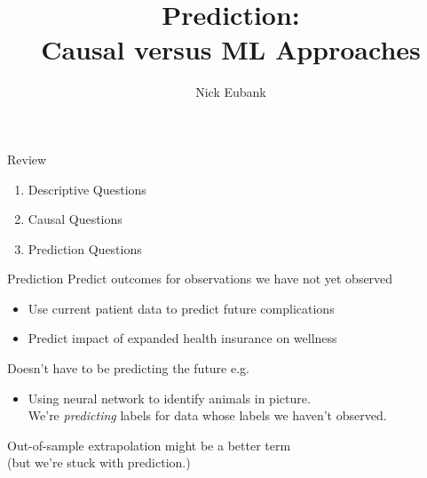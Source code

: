 \documentclass[11pt,handout]{beamer}
\title{Prediction: \\ Causal versus ML Approaches}
\author{\small Nick Eubank}
\date{\vspace*{.3in} \date}
\begin{document}
\begin{frame}
\maketitle
\end{frame}

\begin{frame}[c]{Review}

\begin{enumerate}
  \item Descriptive Questions
  \begin{itemize}
  \end{itemize}
  \item Causal Questions
  \begin{itemize}
  \end{itemize}
  \item \alert<6->{Prediction Questions}
\end{enumerate}
\end{frame}

\begin{frame}[c]{Prediction}
  \pause Predict outcomes for observations we have not yet observed
  \begin{itemize}
    \pause \item Use current patient data to predict future complications
    \pause \item Predict impact of expanded health insurance on wellness
  \end{itemize}
  \pause Doesn't have to be predicting \alert{the future}
  \pause e.g.
  \begin{itemize}
    \item Using neural network to identify animals in picture. \\
    \pause We're \emph{predicting} labels for data whose labels we haven't observed.
  \end{itemize}
  \vspace{0.2cm}
  \pause \alert{Out-of-sample extrapolation} might be a better term \\
  (but we're stuck with prediction.)
\end{frame}
\end{document}
